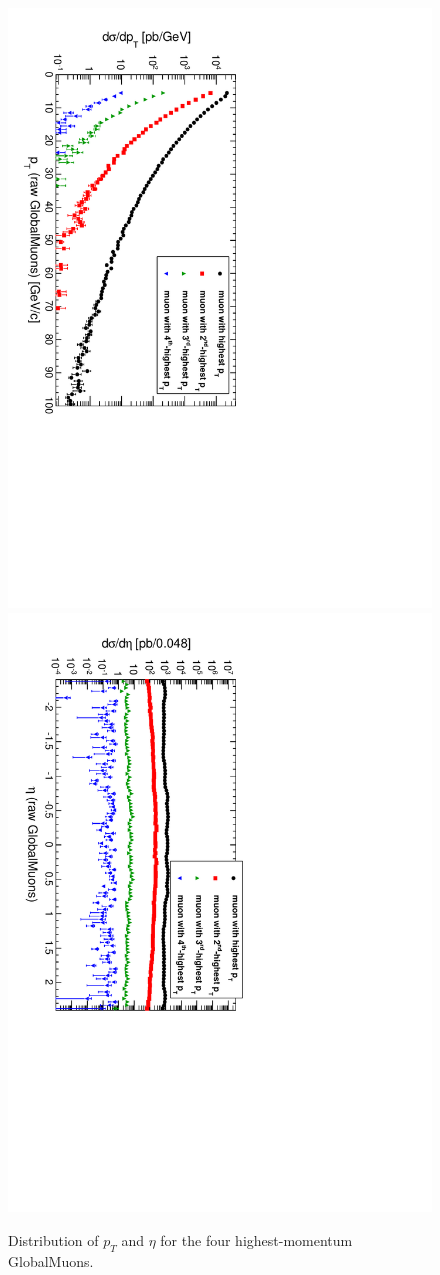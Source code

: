 \documentclass[12pt]{article}
\begin{document}
\begin{figure}
\includegraphics[height=0.5\linewidth, angle=90]{fig/backgroundsMatching_plot/ptcurves_GlobalMuons.pdf}
\includegraphics[height=0.5\linewidth, angle=90]{fig/backgroundsMatching_plot/etacurves_GlobalMuons.pdf}

\caption{Distribution of $p_T$ and $\eta$ for the four highest-momentum GlobalMuons. \label{fig:curves_GlobalMuons}}
\end{figure}
\end{document}
